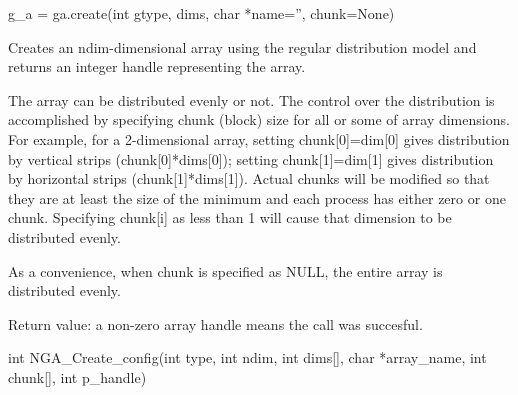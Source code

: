 \documentclass[10pt]{article}
\begin{document}
\begin{pyapi}
\begin{pycode}
g_a = ga.create(int gtype, dims, char *name='', chunk=None)
\end{pycode}
\begin{funcargs}
\end{funcargs}
\end{pyapi}

\dcoll

\begin{desc}

Creates an ndim-dimensional array using the regular distribution model and
returns an integer handle representing the array.

The array can be distributed evenly or not. The control over the distribution
is accomplished by specifying chunk (block) size for all or some of array
dimensions. For example, for a 2-dimensional array, setting chunk[0]=dim[0]
gives distribution by vertical strips (chunk[0]*dims[0]); setting
chunk[1]=dim[1] gives distribution by horizontal strips (chunk[1]*dims[1]).
Actual chunks will be modified so that they are at least the size of the
minimum and each process has either zero or one chunk. Specifying chunk[i] as
less than 1 will cause that dimension to be distributed evenly.

As a convenience, when chunk is specified as NULL, the entire array is
distributed evenly.

Return value: a non-zero array handle means the call was succesful.

\end{desc}



\begin{capi}
\begin{ccode}
int NGA_Create_config(int type, int ndim, int dims[], char *array_name,
                      int chunk[], int p_handle)
\end{ccode}
\begin{funcargs}
\end{funcargs}
\end{capi}
\end{document}
